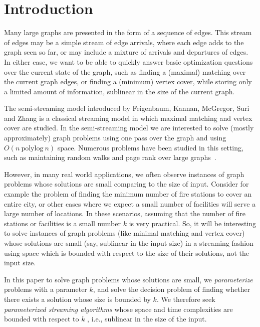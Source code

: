 \documentclass[11pt,letter]{article}
\begin{document}
\newpage

\section{Introduction}
Many large graphs are presented in the form of a sequence of edges.
This stream of edges may be a simple stream of edge arrivals, where
each edge adds to the graph seen so far, or may include a mixture of
arrivals and departures of edges.
In either case, we want to be able to quickly answer basic optimization
questions over the current state of the graph, such as finding a
(maximal) matching over the current graph edges, or finding a
(minimum) vertex cover, while storing only a limited amount of
information, sublinear in the size of the current graph.

The semi-streaming model introduced by
Feigenbaum, Kannan, McGregor, Suri and Zhang \cite{FKMSZ05}  is a classical
streaming model in which maximal matching and vertex cover are studied.
In the semi-streaming model we are interested to solve (mostly approximately) graph problems
using one pass over the graph and using $O(n\ \text{polylog}\ n)$ space.
Numerous problems have been studied in this setting, such as
maintaining random walks and page rank over large graphs~\cite{DGP08}.

However, in many real world applications, we often observe instances of graph problems
whose solutions are small comparing to the size of input. Consider for example
the problem of finding the minimum number of fire stations to cover an entire city,
or other cases where we expect a small number of facilities will serve
a large number of locations. In these scenarios, assuming that the number of fire
stations or facilities is a small number $k$ is very practical. So, it will be interesting
to solve instances of graph problems (like minimal matching
and vertex cover) whose solutions are small (say, sublinear in the input size)
in a streaming fashion using space which is bounded with respect to
the size of their solutions, not the input size.




In this paper to solve graph problems whose solutions are small,
we {\em parameterize} problems with a parameter $k$, and
solve the decision problem of finding whether there exists a solution whose size is bounded by $k$.
We therefore seek \emph{parameterized streaming algorithms} whose space and time complexities
are bounded with respect to $k$ , i.e.,  sublinear in the size of the input.
\end{document}
